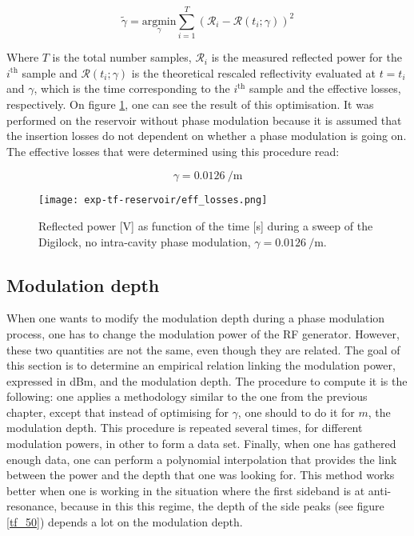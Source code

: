 \begin{equation}
	\tilde{\gamma} = \underset{\gamma}{\mathrm{argmin}} \sum_{i=1}^T (\mathcal{R}_i - \mathcal{R}(t_i;\gamma))^2
\end{equation}

Where $T$ is the total number samples, $\mathcal{R}_i$ is the measured reflected power for the $i^{\text{th}}$ sample and $\mathcal{R}(t_i;\gamma)$ is the theoretical rescaled reflectivity evaluated at $t=t_i$ and $\gamma$, which is the time corresponding to the $i^{\text{th}}$ sample and the effective losses, respectively. On figure \ref{eff-losses}, one can see the result of this optimisation. It was performed on the reservoir without phase modulation because it is assumed that the insertion losses do not dependent on whether a phase modulation is going on. The effective losses that were determined using this procedure read:

\begin{equation}
	\gamma = \SI{0.0126}{\per\metre}
\end{equation}

\begin{figure}
	\centering
	\texttt{[image: exp-tf-reservoir/eff\_losses.png]}
	\caption{Reflected power [V] as function of the time [s] during a sweep of the Digilock, no intra-cavity phase modulation, $\gamma = \SI{0.0126}{\per\metre}$.}
	\label{eff-losses}
\end{figure}


\subsection{Modulation depth}

When one wants to modify the modulation depth during a phase modulation process, one has to change the modulation power of the RF generator. However, these two quantities are not the same, even though they are related. The goal of this section is to determine an empirical relation linking the modulation power, expressed in dBm, and the modulation depth. The procedure to compute it is the following: one applies a methodology similar to the one from the previous chapter, except that instead of optimising for $\gamma$, one should to do it for $m$, the modulation depth. This procedure is repeated several times, for different modulation powers, in other to form a data set. Finally, when one has gathered enough data, one can perform a polynomial interpolation that provides the link between the power and the depth that one was looking for. This method works better when one is working in the situation where the first sideband is at anti-resonance, because in this this regime, the depth of the side peaks (see figure \ref{tf_50}) depends a lot on the modulation depth.\\

